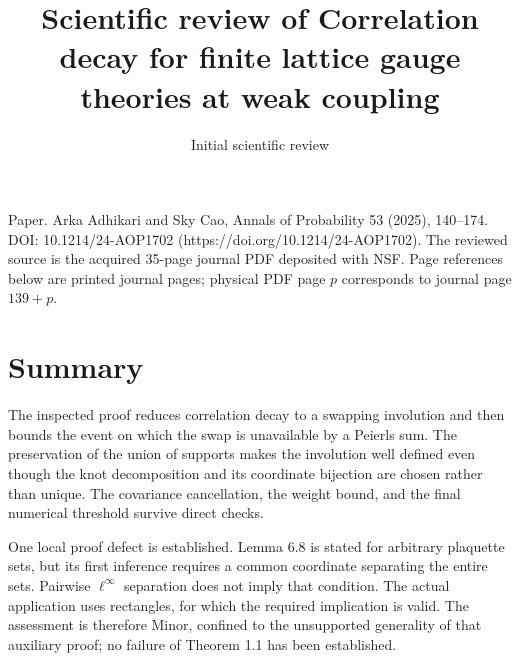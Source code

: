 \documentclass[10pt]{article}
\title{Scientific review of
Correlation decay for finite lattice gauge theories at weak coupling}
\author{Initial scientific review}
\date{}
\begin{document}
\maketitle
Paper. Arka Adhikari and Sky Cao, Annals of Probability 53 (2025), 140–174. DOI: 10.1214/24-AOP1702 (https://doi.org/10.1214/24-AOP1702). The reviewed source is the acquired 35-page journal PDF deposited with NSF. Page references below are printed journal pages; physical PDF page \(p\) corresponds to journal page \(139+p\).\par
\section*{Summary}
The inspected proof reduces correlation decay to a swapping involution and then bounds the event on which the swap is unavailable by a Peierls sum. The preservation of the union of supports makes the involution well defined even though the knot decomposition and its coordinate bijection are chosen rather than unique. The covariance cancellation, the weight bound, and the final numerical threshold survive direct checks.\par
One local proof defect is established. Lemma 6.8 is stated for arbitrary plaquette sets, but its first inference requires a common coordinate separating the entire sets. Pairwise \(\ell^\infty\) separation does not imply that condition. The actual application uses rectangles, for which the required implication is valid. The assessment is therefore Minor, confined to the unsupported generality of that auxiliary proof; no failure of Theorem 1.1 has been established.\par
\end{document}
